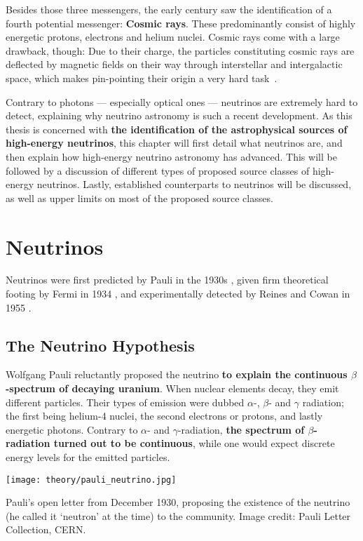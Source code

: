 Besides those three messengers, the early  century saw the identification of a fourth potential messenger: \textbf{Cosmic rays}. These predominantly consist of highly energetic protons, electrons and helium nuclei. Cosmic rays come with a large drawback, though: Due to their charge, the particles constituting cosmic rays are deflected by magnetic fields on their way through interstellar and intergalactic space, which makes pin-pointing their origin a very hard task~\cite{Beckman2021}.

Contrary to photons --- especially optical ones --- neutrinos are extremely hard to detect, explaining why neutrino astronomy is such a recent development. As this thesis is concerned with \textbf{the identification of the astrophysical sources of high-energy neutrinos}, this chapter will first detail what neutrinos are, and then explain how high-energy neutrino astronomy has advanced. This will be followed by a discussion of different types of proposed source classes of high-energy neutrinos. Lastly, established counterparts to neutrinos will be discussed, as well as upper limits on most of the proposed source classes.

\section{Neutrinos}
Neutrinos were first predicted by Pauli in the 1930s , given firm theoretical footing by Fermi in 1934 , and experimentally detected by Reines and Cowan in 1955 .

\subsection{The Neutrino Hypothesis}\label{neutrino_hypothesis}
Wolfgang Pauli reluctantly proposed the neutrino \textbf{to explain the continuous $\beta$-spectrum of decaying uranium}. When nuclear elements decay, they emit different particles. Their types of emission were dubbed $\alpha$-, $\beta$- and $\gamma$ radiation; the first being helium-4 nuclei, the second electrons or protons, and lastly energetic photons. Contrary to $\alpha$- and $\gamma$-radiation, \textbf{the spectrum of $\beta$-radiation turned out to be continuous}, while one would expect discrete energy levels for the emitted particles.

\begin{marginfigure}
    \texttt{[image: theory/pauli\_neutrino.jpg]}
    \caption[Pauli's letter proposing the neutrino]{Pauli's open letter from December 1930, proposing the existence of the neutrino (he called it `neutron' at the time) to the community. Image credit: Pauli Letter Collection, CERN.}
\end{marginfigure}

